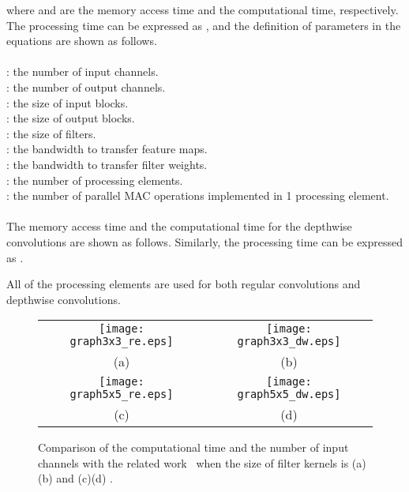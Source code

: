 \documentclass[runningheads]{llncs}
\begin{document}
where  and  are the memory access time and the computational time, respectively. The processing time can be expressed as , and the definition of parameters in the equations are shown as follows.\\
\\
: the number of input channels.\\
: the number of output channels.\\
: the size of input blocks.\\
: the size of output blocks.\\
: the size of filters.\\
: the bandwidth to transfer feature maps.\\
: the bandwidth to transfer filter weights.\\
: the number of processing elements.\\
: the number of parallel MAC operations implemented in 1 processing element.\\
\\
The memory access time and the computational time for the depthwise convolutions are shown as follows. Similarly, the processing time can be expressed as . 





All of the processing elements are used for both regular convolutions and depthwise convolutions.

\begin{figure}
\begin{tabular}{cc}
\centering
\texttt{[image: graph3x3\_re.eps]} & \texttt{[image: graph3x3\_dw.eps]}\\
(a) & (b)\\
\texttt{[image: graph5x5\_re.eps]} & \texttt{[image: graph5x5\_dw.eps]}\\
(c) & (d)\\
\end{tabular}
\caption{Comparison of the computational time and the number of input channels with the related work~\cite{Yu20} when the size of filter kernels is (a)(b)  and (c)(d) .}
\label{fig:comparison}
\end{figure}
\end{document}

